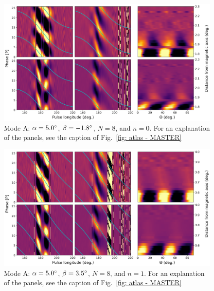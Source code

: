 \begin{figure}
	\begin{center}
		\includegraphics[width=\atlasHeightFrac\textwidth]{Figures/B0031/atlas/A_517005008000_plots}
		\caption[Atlas results: Mode A -- $\alpha=5.0\degr$, $\beta=-1.8\degr$, $N=8$, $n=0$]{Mode A: $\alpha=5.0\degr$, $\beta=-1.8\degr$, $N=8$, and $n=0$. For an explanation of the panels, see the caption of Fig.~\ref{fig: atlas - MASTER} }
		\label{fig: atlas - A_517005008000}
	\end{center}
\end{figure}

\begin{figure}
	\begin{center}
		\includegraphics[width=\atlasHeightFrac\textwidth]{Figures/B0031/atlas/A_517005008001_plots}
		\caption[Atlas results: Mode A -- $\alpha=5.0\degr$, $\beta=3.5\degr$, $N=8$, $n=1$]{Mode A: $\alpha=5.0\degr$, $\beta=3.5\degr$, $N=8$, and $n=1$. For an explanation of the panels, see the caption of Fig.~\ref{fig: atlas - MASTER} }
		\label{fig: atlas - A_517005008001}
	\end{center}
\end{figure}

